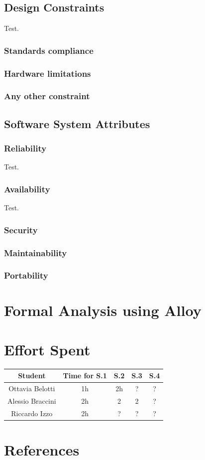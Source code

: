 \documentclass[table, 12pt]{article}
\begin{document}
\subsection{Design Constraints}
Test.

\subsubsection{Standards compliance}
\subsubsection{Hardware limitations}
\subsubsection{Any other constraint}

\subsection{Software System Attributes}
\subsubsection{Reliability}
Test.

\subsubsection{Availability}
Test.

\subsubsection{Security}
\subsubsection{Maintainability}
\subsubsection{Portability}

\section{Formal Analysis using Alloy}
\section{Effort Spent}
    \begin{tabular}{| c || c | c| c| c |}
        \hline
        Student & Time for S.1 & S.2 & S.3 & S.4 \\ \hline
        Ottavia Belotti & 1h & 2h & ? & ? \\
        Alessio Braccini & 2h & 2 & 2 & ? \\
        Riccardo Izzo & 2h & ? & ? & ? \\
        \hline
    \end{tabular}

\section{References}
\end{document}
